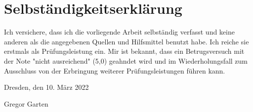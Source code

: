  

\section*{\vfill{} \thispagestyle{empty}
Selbständigkeitserklärung}

Ich  versichere,  dass  ich  die  vorliegende  Arbeit  selbständig  verfasst  und  keine 
anderen als die angegebenen Quellen und Hilfsmittel benutzt habe. Ich reiche sie 
erstmals als Prüfungsleistung ein. Mir ist bekannt, dass ein Betrugsversuch mit der 
Note  "nicht  ausreichend"  (5,0)  geahndet  wird  und  im  Wiederholungsfall  zum 
Ausschluss von der Erbringung weiterer Prüfungsleistungen führen kann.
\bigskip{}

\noindent Dresden, den 10. März 2022%
\vspace{2.5cm}

\noindent Gregor Garten \cleardoublepage{}